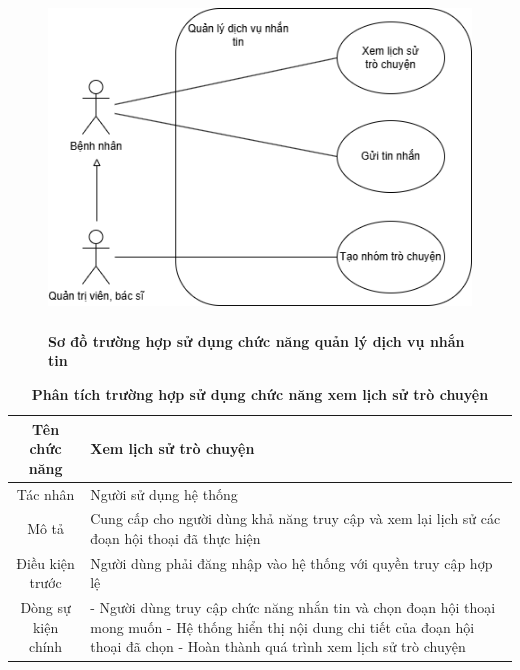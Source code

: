 \begin{figure}[H]
	\centering
	\includegraphics[width=12cm,height=9cm]{Images/use_case/use_case_chat.png}
	\caption[Sơ đồ trường hợp sử dụng chức năng quản lý dịch vụ nhắn tin]{\bfseries \fontsize{12pt}{0pt}
		\selectfont Sơ đồ trường hợp sử dụng chức năng quản lý dịch vụ nhắn tin}
	\label{use_case_chat} %
\end{figure}

\begin{table}[H]
	\caption{\bfseries \fontsize{12pt}{0pt}\selectfont Phân tích trường hợp sử dụng chức năng xem lịch sử trò chuyện}
	\centering
	\begin{tabularx}{0.9\textwidth}{|c|X|}
		\hline
		\textbf{Tên chức năng} & \textbf{Xem lịch sử trò chuyện}                                                              \\
		\hline
		Tác nhân               & Người sử dụng hệ thống                                                                       \\
		\hline
		Mô tả                  & Cung cấp cho người dùng khả năng truy cập và xem lại lịch sử các đoạn hội thoại đã thực hiện \\
		\hline
		Điều kiện trước        & Người dùng phải đăng nhập vào hệ thống với quyền truy cập hợp lệ                             \\
		\hline
		Dòng sự kiện chính     &
		- Người dùng truy cập chức năng nhắn tin và chọn đoạn hội thoại mong muốn \newline
		- Hệ thống hiển thị nội dung chi tiết của đoạn hội thoại đã chọn \newline
		- Hoàn thành quá trình xem lịch sử trò chuyện                                                                         \\
		\hline
	\end{tabularx}
\end{table}

